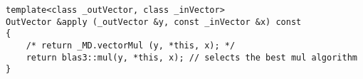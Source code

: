 {
\small
\begin{lstlisting}
template<class _outVector, class _inVector>
OutVector &apply (_outVector &y, const _inVector &x) const
{
	/* return _MD.vectorMul (y, *this, x); */
	return blas3::mul(y, *this, x); // selects the best mul algorithm
}
\end{lstlisting}
}
